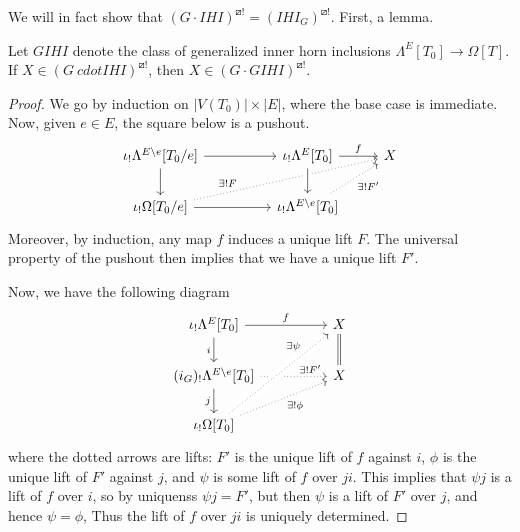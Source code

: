 \documentclass[a4paper,10pt,draft]{article}%
\numberwithin{equation}{section}%
\numberwithin{figure}{section}
\begin{document}
We will in fact show that $(G \cdot IHI)^{\boxslash !} = (IHI_G)^{\boxslash !}$.
First, a lemma.

\begin{lemma}
      Let $GIHI$ denote the class of generalized inner horn inclusions $\Lambda^E[T_0] \to \Omega[T]$. 
      If $X \in (G\ cdot IHI)^{\boxslash !}$, then
      $X \in (G \cdot GIHI)^{\boxslash !}$. 
\end{lemma}
\begin{proof}
      We go by induction on $|V(T_0)| \times |E|$, where the base case is immediate.
      Now, given $e\in E$, the square below is a pushout.
      \begin{equation}
            \begin{tikzcd}
                  \iota_!\Lambda^{E\setminus e}[T_0/e] \arrow[rr] \arrow[d]
                  &&
                  \iota_!\Lambda^E[T_0] \arrow[r, "f"]
                  &
                  X
                  \\
                  \iota_!\Omega[T_0/e] \arrow[rr] \arrow[urrr, dotted, near start, "\exists! F"]
                  &&
                  \iota_!\Lambda^{E\setminus e}[T_0] \arrow[ur, dotted, "\exists! F'"'] \arrow[u, leftarrow, crossing over]
            \end{tikzcd}
      \end{equation}
      Moreover, by induction, any map $f$ induces a unique lift $F$.
      The universal property of the pushout then implies that we have a unique lift $F'$.

      Now, we have the following diagram
      \begin{equation}
            \begin{tikzcd}
                  \iota_!\Lambda^{E}[T_0] \arrow[rr, "f"] \arrow[d, "i"']
                  &&
                  X \arrow[d, equal]
                  \\
                  |[alias = U]| (i_G)_!\Lambda^{E \setminus e}[T_0] \arrow[d, "j"'] \arrow[rr, dotted, near end, "\exists! F'"]
                  &&
                  |[alias=V]| X
                  \\
                  \iota_!\Omega[T_0]
                  \arrow[uurr, dotted, near end, crossing over, "\exists \psi"] \arrow[urr, dotted, "\exists! \phi"']
            \end{tikzcd}
      \end{equation}
      where the dotted arrows are lifts:
      $F'$ is the unique lift of $f$ against $i$,
      $\phi$ is the unique lift of $F'$ against $j$, and
      $\psi$ is some lift of $f$ over $ji$.
      This implies that $\psi j$ is a lift of $f$ over $i$, so by uniquenss $\psi j = F'$, but then
      $\psi$ is a lift of $F'$ over $j$, and hence $\psi = \phi$,
      Thus the lift of $f$ over $j i$ is uniquely determined.
\end{proof}
\end{document}
